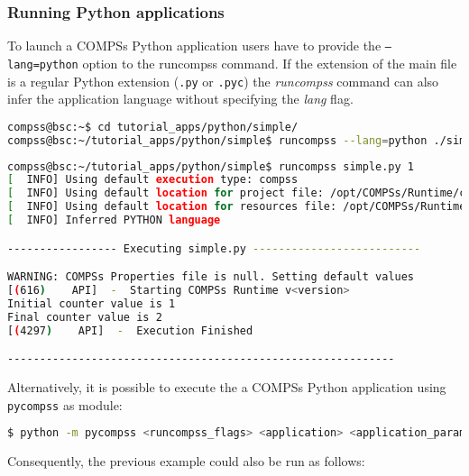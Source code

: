 \subsubsection{Running Python applications}
To launch a COMPSs Python application users have to provide the \texttt{--lang=python} option to the runcompss command. If the extension
of the main file is a regular Python extension (\verb|.py| or \verb|.pyc|) the \textit{runcompss} command can also infer the 
application language without specifying the \textit{lang} flag. 

\begin{lstlisting}[language=bash]
compss@bsc:~$ cd tutorial_apps/python/simple/
compss@bsc:~/tutorial_apps/python/simple$ runcompss --lang=python ./simple.py <initial_number>
\end{lstlisting}

\begin{lstlisting}[language=bash]
compss@bsc:~/tutorial_apps/python/simple$ runcompss simple.py 1
[  INFO] Using default execution type: compss
[  INFO] Using default location for project file: /opt/COMPSs/Runtime/configuration/xml/projects/default_project.xml
[  INFO] Using default location for resources file: /opt/COMPSs/Runtime/configuration/xml/resources/default_resources.xml
[  INFO] Inferred PYTHON language

----------------- Executing simple.py --------------------------

WARNING: COMPSs Properties file is null. Setting default values
[(616)    API]  -  Starting COMPSs Runtime v<version>
Initial counter value is 1
Final counter value is 2
[(4297)    API]  -  Execution Finished

------------------------------------------------------------
\end{lstlisting}


Alternatively, it is possible to execute the a COMPSs Python application using \verb|pycompss| as module:

\begin{lstlisting}[language=bash]
$ python -m pycompss <runcompss_flags> <application> <application_parameters>
\end{lstlisting}

Consequently, the previous example could also be run as follows:

